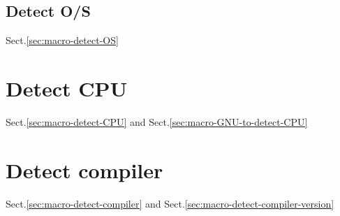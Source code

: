 \subsection{Detect O/S}


Sect.\ref{sec:macro-detect-OS}


\section{Detect CPU}

Sect.\ref{sec:macro-detect-CPU} and Sect.\ref{sec:macro-GNU-to-detect-CPU}

\section{Detect compiler}

Sect.\ref{sec:macro-detect-compiler} and Sect.\ref{sec:macro-detect-compiler-version}


